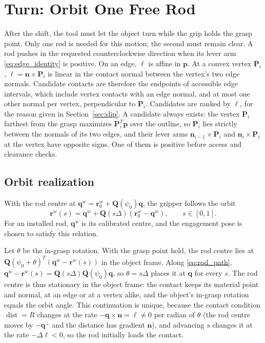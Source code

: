 \section{Turn: Orbit One Free Rod}
\label{sec:turn}
\label{sec:rod}

After the shift, the tool must let the object turn while the grip holds the grasp point. Only one rod is needed for this motion; the second must remain clear. A rod pushes in the requested counterclockwise direction when its lever arm \eqref{eq:edge_identity} is positive. On an edge, $\ell$ is affine in $\mathbf p$. At a convex vertex $\mathbf P_i$, $\ell=\mathbf n\times\mathbf P_i$ is linear in the contact normal between the vertex's two edge normals. Candidate contacts are therefore the endpoints of accessible edge intervals, which include vertex contacts with an edge normal, and at most one other normal per vertex, perpendicular to $\mathbf P_i$. Candidates are ranked by $\ell$, for the reason given in Section~\ref{sec:slip}. A candidate always exists: the vertex $\mathbf P_i$ farthest from the grasp maximizes $\mathbf P_i^T\mathbf p$ over the outline, so $\mathbf P_i$ lies strictly between the normals of its two edges, and their lever arms $\mathbf n_{i-1}\times\mathbf P_i$ and $\mathbf n_i\times\mathbf P_i$ at the vertex have opposite signs. One of them is positive before access and clearance checks.

\subsection{Orbit realization}
\label{sec:orbit}

With the rod centre at $\mathbf q^w=\mathbf r^w_0+\mathbf Q(\psi_0)\mathbf q$, the gripper follows the orbit
\begin{equation}
    \mathbf r^w(s)=\mathbf q^w+\mathbf Q(s\Delta)(\mathbf r^w_0-\mathbf q^w),\qquad s\in[0,1].
    \label{eq:rod_path}
\end{equation}
For an installed rod, $\mathbf q^w$ is its calibrated centre, and the engagement pose is chosen to satisfy this relation.

Let $\theta$ be the in-grasp rotation. With the grasp point held, the rod centre lies at $\mathbf Q(\psi_0+\theta)^T(\mathbf q^w-\mathbf r^w(s))$ in the object frame. Along \eqref{eq:rod_path}, $\mathbf q^w-\mathbf r^w(s)=\mathbf Q(s\Delta)\mathbf Q(\psi_0)\mathbf q$, so $\theta=s\Delta$ places it at $\mathbf q$ for every $s$. The rod centre is thus stationary in the object frame: the contact keeps its material point and normal, at an edge or at a vertex alike, and the object's in-grasp rotation equals the orbit angle. This continuation is unique, because the contact condition $\operatorname{dist}=R$ changes at the rate $-\mathbf q\times\mathbf n=\ell\neq0$ per radian of $\theta$ (the rod centre moves by $-\mathbf q^\perp$ and the distance has gradient $\mathbf n$), and advancing $s$ changes it at the rate $-\Delta\ell<0$, so the rod initially loads the contact.


